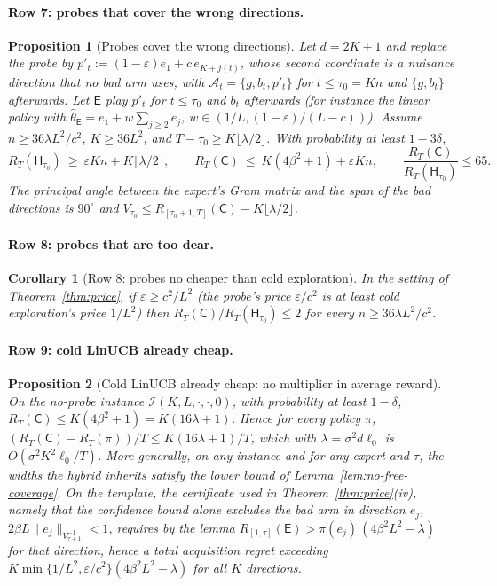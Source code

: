 \documentclass{article}
\newtheorem{proposition}{Proposition}
\newtheorem{corollary}{Corollary}
\theoremstyle{definition}
\theoremstyle{remark}
\newcommand{\eps}{\varepsilon}
\theoremstyle{remark}
\newcommand{\Cold}{\mathsf{C}}
\newcommand{\Exp}{\mathsf{E}}
\newcommand{\Hyb}{\mathsf{H}}
\begin{document}
\paragraph{Row 7: probes that cover the wrong directions.}
\begin{proposition}[Probes cover the wrong directions]
\label{prop:cat-wrong}
Let $d=2K+1$ and replace the probe by
$p'_t:=(1-\eps)e_1+c\,e_{K+j(t)}$, whose second coordinate is a nuisance
direction that no bad arm uses, with $\mathcal A_t=\{g,b_t,p'_t\}$ for
$t\le\tau_0=Kn$ and $\{g,b_t\}$ afterwards. Let $\Exp$ play $p'_t$ for
$t\le\tau_0$ and $b_t$ afterwards (for instance the linear policy with
$\widehat\theta_{\Exp}=e_1+w\sum_{j\ge2}e_j$, $w\in(1/L,(1-\eps)/(L-c))$).
Assume $n\ge36\lambda L^2/c^2$, $K\ge36L^2$, and $T-\tau_0\ge K\lfloor\lambda/2\rfloor$.
With probability at least $1-3\delta$,
\[
R_T(\Hyb_{\tau_0})\ \ge\ \eps Kn+K\lfloor\lambda/2\rfloor,
\qquad
R_T(\Cold)\ \le\ K(4\beta^2+1)+\eps Kn,
\qquad
\frac{R_T(\Cold)}{R_T(\Hyb_{\tau_0})}\le65 .
\]
The principal angle between the expert's Gram matrix and the span of the bad
directions is $90^\circ$ and $V_{\tau_0}\le R_{[\tau_0+1,T]}(\Cold)-K\lfloor\lambda/2\rfloor$.
\end{proposition}

\paragraph{Row 8: probes that are too dear.}
\begin{corollary}[Row 8: probes no cheaper than cold exploration]
\label{cor:cat-dear}
In the setting of Theorem~\ref{thm:price}, if $\eps\ge c^2/L^2$ (the probe's
price $\eps/c^2$ is at least cold exploration's price $1/L^2$) then
$R_T(\Cold)/R_T(\Hyb_{\tau_0})\le2$ for every $n\ge36\lambda L^2/c^2$.
\end{corollary}

\paragraph{Row 9: cold LinUCB already cheap.}
\begin{proposition}[Cold LinUCB already cheap: no multiplier in average reward]
\label{prop:cat-cheap}
On the no-probe instance $\mathcal I(K,L,\cdot,\cdot,0)$, with probability
at least $1-\delta$, $R_T(\Cold)\le K(4\beta^2+1)=K(16\lambda+1)$. Hence for
\emph{every} policy $\pi$, $(R_T(\Cold)-R_T(\pi))/T\le K(16\lambda+1)/T$, which with
$\lambda=\sigma^2d\ell_0$ is $O(\sigma^2K^2\ell_0/T)$. More generally, on any
instance and for any expert and $\tau$, the widths the hybrid inherits satisfy
the lower bound of Lemma~\ref{lem:no-free-coverage}. On the template, the
certificate used in Theorem~\ref{thm:price}(iv), namely that the confidence
bound alone excludes the bad arm in direction $e_j$,
$2\beta L\|e_j\|_{V_{\tau+1}^{-1}}<1$, requires by the lemma
$R_{[1,\tau]}(\Exp)>\pi(e_j)\,(4\beta^2L^2-\lambda)$ for that direction, hence
a total acquisition regret exceeding
$K\min\{1/L^2,\eps/c^2\}(4\beta^2L^2-\lambda)$ for all $K$ directions.
\end{proposition}
\end{document}
